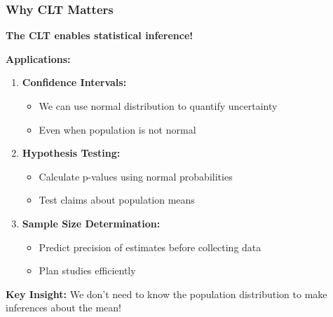 \documentclass{beamer}
\begin{document}
\begin{frame}
\frametitle{Why CLT Matters}
\textbf{The CLT enables statistical inference!}

\vspace{0.5cm}
\textbf{Applications:}
\begin{enumerate}
\item \textbf{Confidence Intervals:}
  \begin{itemize}
  \item We can use normal distribution to quantify uncertainty
  \item Even when population is not normal
  \end{itemize}

\item \textbf{Hypothesis Testing:}
  \begin{itemize}
  \item Calculate p-values using normal probabilities
  \item Test claims about population means
  \end{itemize}

\item \textbf{Sample Size Determination:}
  \begin{itemize}
  \item Predict precision of estimates before collecting data
  \item Plan studies efficiently
  \end{itemize}
\end{enumerate}

\vspace{0.5cm}
\textbf{Key Insight:} We don't need to know the population distribution to make inferences about the mean!
\end{frame}
\end{document}
